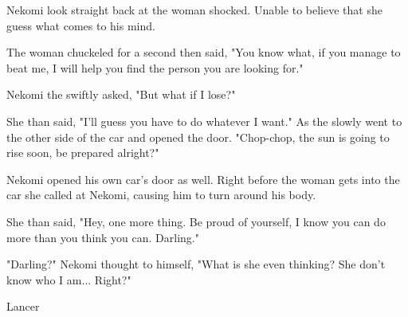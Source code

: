 Nekomi look straight back at the woman shocked. Unable to believe that she guess what comes to his mind.

The woman chuckeled for a second then said, "You know what, if you manage to beat me, I will help you find the person you are looking for."

Nekomi the swiftly asked, "But what if I lose?"

She than said, "I'll guess you have to do whatever I want." As the slowly went to the other side of the car and opened the door. "Chop-chop, the sun is going to rise soon, be prepared alright?"

Nekomi opened his own car's door as well. Right before the woman gets into the car she called at Nekomi, causing him to turn around his body.

She than said, "Hey, one more thing. Be proud of yourself, I know you can do more than you think you can. Darling."

"Darling?" Nekomi thought to himself, "What is she even thinking? She don't know who I am... Right?"

Lancer